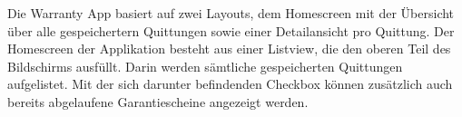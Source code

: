 Die Warranty App basiert auf zwei Layouts, dem Homescreen mit der Übersicht über alle gespeichertern Quittungen sowie einer Detailansicht pro Quittung. 
\newline
Der Homescreen der Applikation besteht aus einer Listview, die den oberen Teil des Bildschirms ausfüllt. Darin werden sämtliche gespeicherten Quittungen aufgelistet.
\newline
Mit der sich darunter befindenden Checkbox können zusätzlich auch bereits abgelaufene Garantiescheine angezeigt werden.